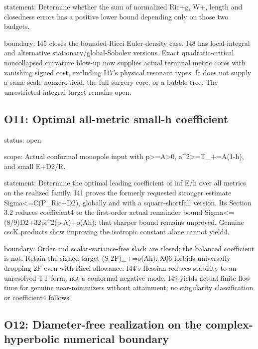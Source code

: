 \documentclass[
  10pt,
]{article}
\begin{document}
statement: Determine whether the sum of normalized Ric+g, W+, length and
closedness errors has a positive lower bound depending only on those two
budgets.

boundary: I45 closes the bounded-Ricci Euler-density case. I48 has
local-integral and alternative stationary/global-Sobolev versions. Exact
quadratic-critical noncollapsed curvature blow-up now supplies actual
terminal metric cores with vanishing signed cost, excluding I47's
physical resonant types. It does not supply a same-scale nonzero field,
the full surgery core, or a bubble tree. The unrestricted integral
target remains open.

\hypertarget{o11-optimal-all-metric-small-h-coefficient}{%
\subsection{O11: Optimal all-metric small-h
coefficient}\label{o11-optimal-all-metric-small-h-coefficient}}

status: open

scope: Actual conformal monopole input with
p\textgreater=A\textgreater0, a\^{}2\textgreater=T\_+=A(1-h), and small
E+D2/R.

statement: Determine the optimal leading coefficient of inf E/h over all
metrics on the realized family. I41 proves the formerly requested
stronger estimate Sigma\textless=C(P\_Ric+D2), globally and with a
square-shortfall version. Its Section 3.2 reduces coefficient4 to the
first-order actual remainder bound
Sigma\textless=(8/9)D2+32pi\^{}2(p-A)+o(Ah); that sharper bound remains
unproved. Genuine cscK products show improving the isotropic constant
alone cannot yield4.

boundary: Order and scalar-variance-free slack are closed; the balanced
coefficient is not. Retain the signed target (S-2F)\_+=o(Ah): X06
forbids universally dropping 2F even with Ricci allowance. I44's Hessian
reduces stability to an unresolved TT form, not a conformal negative
mode. I49 yields actual finite flow time for genuine near-minimizers
without attainment; no singularity classification or coefficient4
follows.

\hypertarget{o12-diameter-free-realization-on-the-complex-hyperbolic-numerical-boundary}{%
\subsection{O12: Diameter-free realization on the complex-hyperbolic
numerical
boundary}\label{o12-diameter-free-realization-on-the-complex-hyperbolic-numerical-boundary}}
\end{document}
